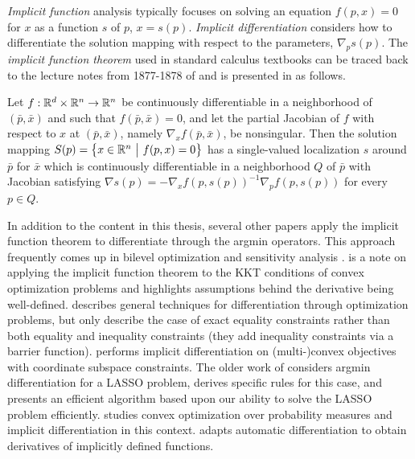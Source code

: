 \emph{Implicit function} analysis
\citep{dontchev2009implicit}
typically focuses on solving an equation $f(p,x)=0$ for $x$ as
a function $s$ of $p$, \ie $x=s(p)$.
\emph{Implicit differentiation} considers how to
differentiate the solution mapping with respect
to the parameters, \ie $\nabla_p s(p)$.
The \emph{implicit function theorem} used in standard
calculus textbooks can be traced back to the
lecture notes from 1877-1878 of \citet{dini1877analisi}
and is presented in
\citet[Theorem~1.B.1]{dontchev2009implicit} as follows.

\begin{theorem}
  \label{theorem:implicit}
  Let $f: \mathbb{R}^d \times \mathbb{R}^n \rightarrow \mathbb{R}^n$ be continuously
  differentiable in a neighborhood of
  $(\bar p, \bar x)$ and such that $f(\bar p, \bar x)=0$,
  and let the partial Jacobian of $f$ with respect to
  $x$ at $(\bar p, \bar x)$, namely $\nabla_x f(\bar p, \bar x)$,
  be nonsingular. Then the solution mapping
  $S(p) = \big\{{x\in \mathbb{R}^n}~\big |~{f(p,x)=0}\big\}$ has a single-valued
  localization $s$ around $\bar p$ for $\bar x$ which
  is continuously differentiable in a neighborhood $Q$
  of $\bar p$ with Jacobian satisfying
  $\nabla s(p) = -\nabla_x f(p, s(p))^{-1} \nabla_p f(p, s(p))$
  for every $p\in Q$.
\end{theorem}

In addition to the content in this thesis, several other papers
apply the implicit function theorem to differentiate through
the argmin operators.
This approach frequently comes up in bilevel optimization
\citep{gould2016differentiating,kunisch2013bilevel}
and sensitivity analysis
\citep{bertsekas1999nonlinear,fiacco1990sensitivity,bell2008algorithmic,bonnans2013perturbation}.
\citep{barratt2018differentiability} is a note on applying the
implicit function theorem to the KKT conditions of convex
optimization problems and highlights assumptions behind the
derivative being well-defined.
\citet{gould2016differentiating} describes general techniques for
differentiation through optimization problems,
but only describe the case of exact equality constraints rather than
both equality and inequality constraints
(they add inequality constraints via a barrier function).
\citet{johnson2016composing} performs implicit differentiation on
(multi-)convex objectives with coordinate subspace constraints.
The older work of \citet{mairal2012task} considers argmin
differentiation for a LASSO problem, derives specific rules for this case, and
presents an efficient algorithm based upon our ability to solve
the LASSO problem efficiently.
\citet{jordan2015convex} studies convex optimization over probability
measures and implicit differentiation in this context.
\citet{bell2008algorithmic} adapts automatic differentiation
to obtain derivatives of implicitly defined functions.

